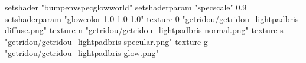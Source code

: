 setshader "bumpenvspecglowworld"
setshaderparam "specscale" 0.9
setshaderparam "glowcolor 1.0 1.0 1.0"
texture 0 "getridou/getridou_lightpadbris-diffuse.png"
texture n "getridou/getridou_lightpadbris-normal.png"
texture s "getridou/getridou_lightpadbris-specular.png"
texture g "getridou/getridou_lightpadbris-glow.png"